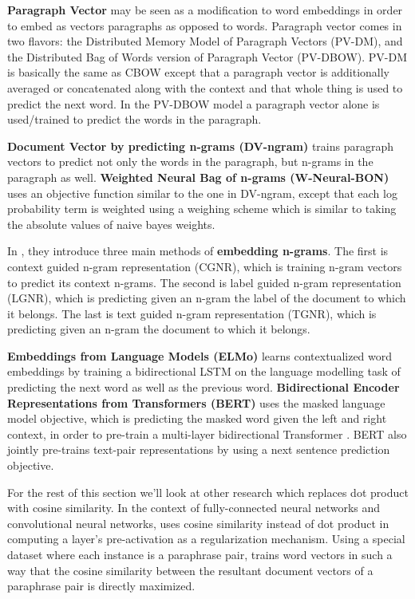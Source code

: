 \documentclass[11pt,a4paper]{article}
\begin{document}
\textbf{Paragraph Vector} \cite{le2014} may be seen as a modification to word embeddings in order to embed as vectors paragraphs as opposed to words. Paragraph vector comes in two flavors: the Distributed Memory Model of Paragraph Vectors (PV-DM), and the Distributed Bag of Words version of Paragraph Vector (PV-DBOW). 
PV-DM is basically the same as CBOW except that a paragraph vector is additionally averaged or concatenated along with the context and that whole thing is used to predict the next word. 
In the PV-DBOW model a paragraph vector alone is used/trained to predict the words in the paragraph.  

 \textbf{Document Vector by predicting n-grams (DV-ngram)} \cite{li2016a} trains paragraph vectors to predict not only the words in the paragraph, but n-grams in
the paragraph as well. 
  \textbf{Weighted Neural Bag of n-grams  (W-Neural-BON)} \cite{li2016b} uses an objective function similar to the one in DV-ngram, except that each log probability term is weighted using a weighing scheme which is similar to taking the absolute values of naive bayes weights.  

In \cite{li2017}, they introduce three main methods of \textbf{embedding n-grams}. The first is context guided n-gram representation (CGNR), which is training n-gram vectors to predict its context n-grams. The second is label guided n-gram representation (LGNR), which is predicting given an n-gram the label of the document to which it belongs. The last is text guided n-gram representation (TGNR), which is predicting given an n-gram the document to which it belongs. 


\textbf{Embeddings from Language Models (ELMo)} \cite{peters2018} learns contextualized word embeddings by training a bidirectional LSTM \cite{hochreiter1997} on the language modelling 
task of predicting the next word as well as the previous word.
\textbf{Bidirectional Encoder Representations from Transformers (BERT)} \cite{devlin2018} uses the masked language model objective, which is predicting the masked word
given the left and right context, in order to pre-train a multi-layer bidirectional Transformer \cite{vaswani2017}. BERT also jointly pre-trains text-pair
representations by using a next sentence prediction objective. 


For the rest of this section we'll look at other research which replaces dot product with cosine similarity. 
In the context of fully-connected neural networks and convolutional neural networks, \cite{luo2017} uses cosine similarity instead of dot product in computing a layer’s pre-activation as a regularization mechanism. 
Using a special dataset where each instance is a paraphrase pair, \cite{wieting2015} trains word vectors in such a way that the cosine similarity between the resultant document vectors of a paraphrase pair is directly maximized. 
\end{document}
